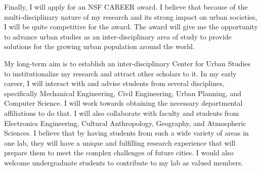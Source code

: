 \documentclass[12pt]{article}
\begin{document}
Finally, I will apply for an NSF CAREER award. I believe that because of the multi-disciplinary nature of my research and its strong impact on urban societies, I will be quite competitive for the award. The award will give me the opportunity to advance urban studies as an inter-disciplinary area of study to provide solutions for the growing urban population around the world.  

My long-term aim is to establish an inter-disciplinary Center for Urban Studies to institutionalize my research and attract other scholars to it. In my early career, I will interact with and advise students from several disciplines, specifically Mechanical Engineering, Civil Engineering, Urban Planning, and Computer Science. I will work towards obtaining the necessary departmental affiliations to do that. I will also collaborate with faculty and students from Electronics Engineering, Cultural Anthropology, Geography, and Atmospheric Sciences. I believe that by having students from such a wide variety of areas in one lab, they will have a unique and fulfilling research experience that will prepare them to meet the complex challenges of future cities. I would also welcome undergraduate students to contribute to my lab as valued members.

 

\end{document}
